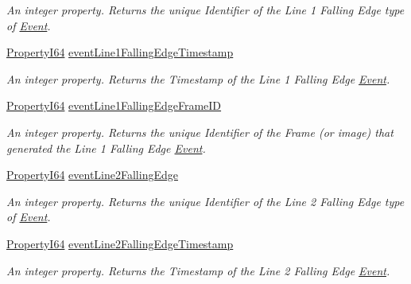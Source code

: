\begin{DoxyCompactItemize}
\begin{DoxyCompactList}\small\item\em An integer property. Returns the unique Identifier of the Line 1 Falling Edge type of \hyperlink{classmv_i_m_p_a_c_t_1_1acquire_1_1_event}{Event}. \end{DoxyCompactList}\item 
\hyperlink{group___common_interface_ga81749b2696755513663492664a18a893}{Property\+I64} \hyperlink{classmv_i_m_p_a_c_t_1_1acquire_1_1_gen_i_cam_1_1_event_control_aa22f4daff35085703f5e7bb8c1a97f2d}{event\+Line1\+Falling\+Edge\+Timestamp}
\begin{DoxyCompactList}\small\item\em An integer property. Returns the Timestamp of the Line 1 Falling Edge \hyperlink{classmv_i_m_p_a_c_t_1_1acquire_1_1_event}{Event}. \end{DoxyCompactList}\item 
\hyperlink{group___common_interface_ga81749b2696755513663492664a18a893}{Property\+I64} \hyperlink{classmv_i_m_p_a_c_t_1_1acquire_1_1_gen_i_cam_1_1_event_control_a0b163246a3099493cfab15e039f4caaf}{event\+Line1\+Falling\+Edge\+Frame\+I\+D}
\begin{DoxyCompactList}\small\item\em An integer property. Returns the unique Identifier of the Frame (or image) that generated the Line 1 Falling Edge \hyperlink{classmv_i_m_p_a_c_t_1_1acquire_1_1_event}{Event}. \end{DoxyCompactList}\item 
\hyperlink{group___common_interface_ga81749b2696755513663492664a18a893}{Property\+I64} \hyperlink{classmv_i_m_p_a_c_t_1_1acquire_1_1_gen_i_cam_1_1_event_control_a3f9dd39d514270395509ec97f096991f}{event\+Line2\+Falling\+Edge}
\begin{DoxyCompactList}\small\item\em An integer property. Returns the unique Identifier of the Line 2 Falling Edge type of \hyperlink{classmv_i_m_p_a_c_t_1_1acquire_1_1_event}{Event}. \end{DoxyCompactList}\item 
\hyperlink{group___common_interface_ga81749b2696755513663492664a18a893}{Property\+I64} \hyperlink{classmv_i_m_p_a_c_t_1_1acquire_1_1_gen_i_cam_1_1_event_control_a4286ac193d81c9a1476fb8d6a670a9bf}{event\+Line2\+Falling\+Edge\+Timestamp}
\begin{DoxyCompactList}\small\item\em An integer property. Returns the Timestamp of the Line 2 Falling Edge \hyperlink{classmv_i_m_p_a_c_t_1_1acquire_1_1_event}{Event}. \end{DoxyCompactList}\item 

\end{DoxyCompactItemize}
